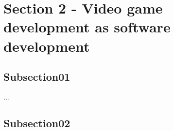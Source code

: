 \section{Section 2 - Video game development as software development}
    \subsection{Subsection01}
    ...

    \subsection{Subsection02}
